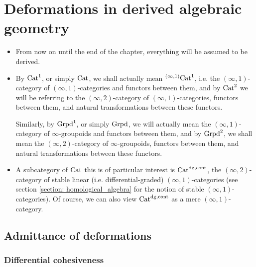     \section{Deformations in derived algebraic geometry}
        \begin{convention} \label{conv: deformation_theory_everything_is_derived}
            \noindent
            \begin{itemize}
                \item From now on until the end of the chapter, everything will be assumed to be derived. 
                \item By $\mathrm{Cat}^1$, or simply $\mathrm{Cat}$, we shall actually mean ${}^{(\infty, 1)}\mathrm{Cat}^1$, i.e. the $(\infty, 1)$-category of $(\infty, 1)$-categories and functors between them, and by $\mathrm{Cat}^2$ we will be referring to the $(\infty, 2)$-category of $(\infty, 1)$-categories, functors between them, and natural transformations between these functors. 
                
                Similarly, by $\mathrm{Grpd}^1$, or simply $\mathrm{Grpd}$, we will actually mean the $(\infty, 1)$-category of $\infty$-groupoids and functors between them, and by $\mathrm{Grpd}^2$, we shall mean the $(\infty, 2)$-category of $\infty$-groupoids, functors between them, and natural transformations between these functors.
                \item A subcategory of $\mathrm{Cat}$ this is of particular interest is $\mathrm{Cat}^{\mathrm{dg}, \mathrm{cont}}$, the $(\infty, 2)$-category of stable linear (i.e. differential-graded) $(\infty, 1)$-categories (see section \ref{section: homological_algebra} for the notion of stable $(\infty, 1)$-categories). Of course, we can also view $\mathrm{Cat}^{\mathrm{dg}, \mathrm{cont}}$ as a mere $(\infty, 1)$-category.
            \end{itemize}
        \end{convention}
        
        \subsection{Admittance of deformations}
            \subsubsection{Differential cohesiveness}
                
        
